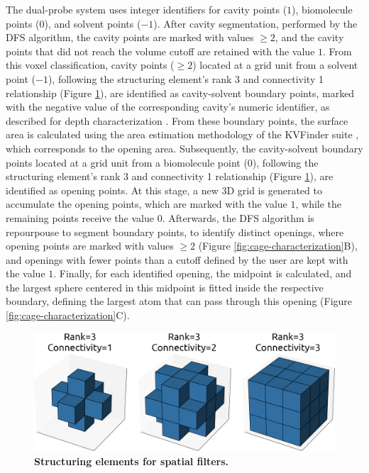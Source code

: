 \documentclass[Ingles]{phdthesis}
\begin{document}
The dual-probe system uses integer identifiers for cavity points ($1$), biomolecule points ($0$), and solvent points ($-1$). After cavity segmentation, performed by the \ac{DFS} algorithm, the cavity points are marked with values $\geq2$, and the cavity points that did not reach the volume cutoff are retained with the value $1$. From this voxel classification, cavity points ($\geq2$) located at a grid unit from a solvent point ($-1$), following the structuring element's rank 3 and connectivity 1 relationship (Figure \ref{fig:structuring-elements}), are identified as cavity-solvent boundary points, marked with the negative value of the corresponding cavity's numeric identifier, as described for depth characterization \cite{guerra2019,guerra2021}. From these boundary points, the surface area is calculated using the area estimation methodology of the KVFinder suite \cite{guerra2019,guerra2020}, which corresponds to the opening area. Subsequently, the cavity-solvent boundary points located at a grid unit from a biomolecule point ($0$), following the structuring element's rank 3 and connectivity 1 relationship (Figure \ref{fig:structuring-elements}), are identified as opening points. At this stage, a new \acs{3D} grid is generated to accumulate the opening points, which are marked with the value $1$, while the remaining points receive the value $0$. Afterwards, the \acs{DFS} algorithm is repourpouse to segment boundary points, to identify distinct openings, where opening points are marked with values $\geq2$ (Figure \ref{fig:cage-characterization}B), and openings with fewer points than a cutoff defined by the user are kept with the value $1$. Finally, for each identified opening, the midpoint is calculated, and the largest sphere centered in this midpoint is fitted inside the respective boundary, defining the largest atom that can pass through this opening (Figure \ref{fig:cage-characterization}C).

\begin{figure}[h]
  \centering
  \includegraphics[scale=0.6]{images/3D-binary-structure.png}
  \caption[Structuring elements for spatial filters]{\textbf{Structuring elements for spatial filters.}}
  \label{fig:structuring-elements}
\end{figure}
\end{document}
